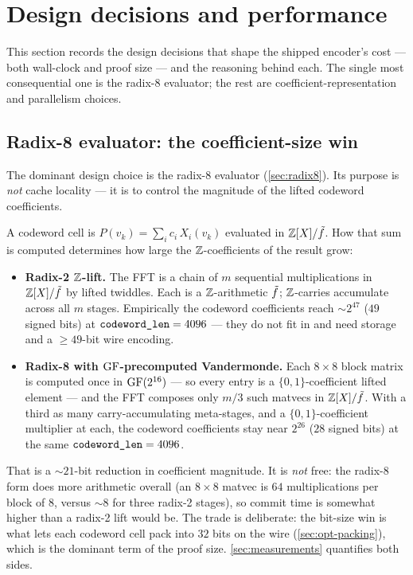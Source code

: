 \section{Design decisions and performance}
\label{sec:optimization}

This section records the design decisions that shape the shipped
encoder's cost --- both wall-clock and proof size --- and the
reasoning behind each. The single most consequential one is the
radix-8 evaluator; the rest are coefficient-representation and
parallelism choices.

\subsection{Radix-8 evaluator: the coefficient-size win}
\label{sec:opt-radix8}

The dominant design choice is the radix-8 evaluator
(\autoref{sec:radix8}). Its purpose is \emph{not} cache locality ---
it is to control the magnitude of the lifted codeword coefficients.

A codeword cell is $P(v_k) = \sum_i c_i\, X_i(v_k)$ evaluated in
$\mathbb{Z}[X]/\tilde f$. How that sum is computed determines how large the
$\mathbb{Z}$-coefficients of the result grow:

\begin{itemize}
  \item \textbf{Radix-2 $\mathbb{Z}$-lift.} The FFT is a chain of $m$
    sequential multiplications in $\mathbb{Z}[X]/\tilde f$ by lifted twiddles. Each is
    a $\mathbb{Z}$-arithmetic $\tilde f$; $\mathbb{Z}$-carries
    accumulate across all $m$ stages. Empirically the codeword
    coefficients reach $\sim 2^{47}$ ($49$ signed bits) at
    $\texttt{codeword\_len} = 4096$ --- they do not fit in 
    and need  storage and a $\ge 49$-bit wire encoding.
  \item \textbf{Radix-8 with $\operatorname{GF}$-precomputed Vandermonde.} Each
    $8 \times 8$ block matrix is computed once in $\operatorname{GF}(2^{16})$ --- so
    every entry is a $\{0,1\}$-coefficient lifted element --- and the
    FFT composes only $m/3$ such matvecs in $\mathbb{Z}[X]/\tilde f$. With a third as
    many carry-accumulating meta-stages, and a $\{0,1\}$-coefficient
    multiplier at each, the codeword coefficients stay near $2^{26}$
    ($28$ signed bits) at the same $\texttt{codeword\_len} = 4096$.
\end{itemize}

That is a $\sim 21$-bit reduction in coefficient magnitude. It is
\emph{not} free: the radix-8 form does more arithmetic overall
(an $8\times 8$ matvec is $64$ multiplications per block of $8$, versus
$\sim 8$ for three radix-2 stages), so commit time is somewhat higher
than a radix-2 lift would be. The trade is deliberate: the bit-size win
is what lets each codeword cell pack into $32$ bits on the wire
(\autoref{sec:opt-packing}), which is the dominant term of the proof
size. \autoref{sec:measurements} quantifies both sides.

